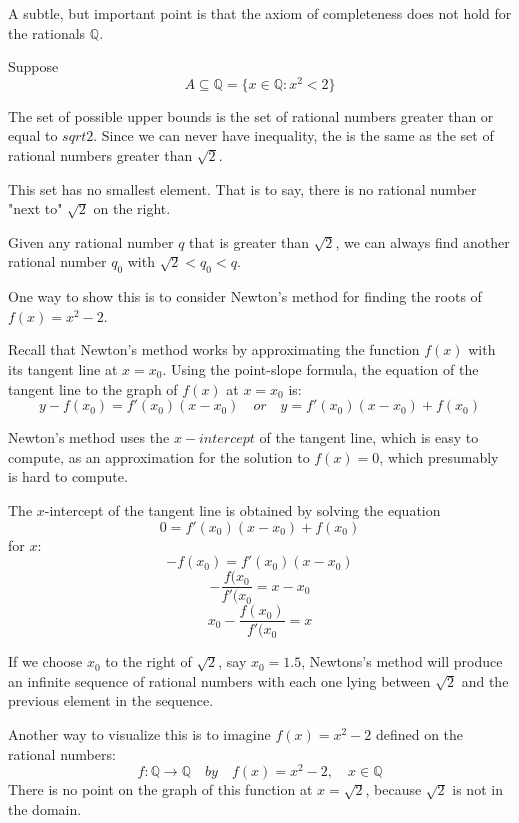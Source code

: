 \par\vspace{0.3 cm}
\begin{example}
A subtle, but important point is that the axiom of completeness does not hold for the rationals $\mathbb{Q}$.  
\par\vspace{0.3 cm}
Suppose
\[
A\subseteq\mathbb{Q} = \{x\in\mathbb{Q} : x^2 < 2\}
\]
\par\vspace{0.3 cm}
The set of possible upper bounds is the set of rational numbers greater than or equal to $sqrt{2}$.  Since we can never have inequality, 
the is the same as the set of rational numbers greater than $\sqrt{2}$. 
\par\vspace{0.3 cm}
This set has no smallest element.  That is to say, there is no rational number "next to" $\sqrt{2}$ on the right.
\par\vspace{0.3 cm}
Given any rational number $q$ that is greater than $\sqrt{2}$, we can always find another rational number $q_0$ with $\sqrt{2}<q_0<q$.
\par\vspace{0.3 cm}
One way to show this is to consider Newton's method for finding the roots of $f(x) = x^2-2$.
\par\vspace{0.3 cm}
Recall that Newton's method works by approximating the function $f(x)$ with its tangent line at $x=x_0$.   Using the point-slope formula, the equation of the tangent line to the graph of $f(x)$ at $x=x_0$ is:
\[
y-f(x_0) = f'(x_0)(x-x_0)\quad or \quad y = f'(x_0)(x-x_0)+f(x_0)
\]
\par\vspace{0.3 cm}
Newton's method uses the $x-intercept$ of the tangent line, which is easy to compute, as an approximation for the solution to $f(x)=0$, which presumably is hard to compute.
\par\vspace{0.3 cm}
The $x$-intercept of the tangent line is obtained by solving the equation
\[
0 = f'(x_0)(x-x_0)+f(x_0)
\]
for $x$:
\[
-f(x_0) = f'(x_0)(x-x_0)
\]
\[
-\frac{f(x_0}{f'(x_0} = x - x_0
\]
\[
x_0-\frac{f(x_0)}{f'(x_0} = x
\]
\par\vspace{0.3 cm}
If we choose $x_0$ to the right of $\sqrt{2}$, say $x_0=1.5$, Newtons's method will produce an infinite sequence of rational numbers with each one lying between $\sqrt{2}$ and the previous element in the sequence.
\par\vspace{0.3 cm}
Another way to visualize this is to imagine $f(x)=x^2-2$ defined on the rational numbers:
\[
f:\mathbb{Q}\rightarrow\mathbb{Q}\quad by\quad f(x)=x^2-2,\quad x\in\mathbb{Q}
\]
There is no point on the graph of this function at $x=\sqrt{2}$, because $\sqrt{2}$ is not in the domain.
\end{example}
